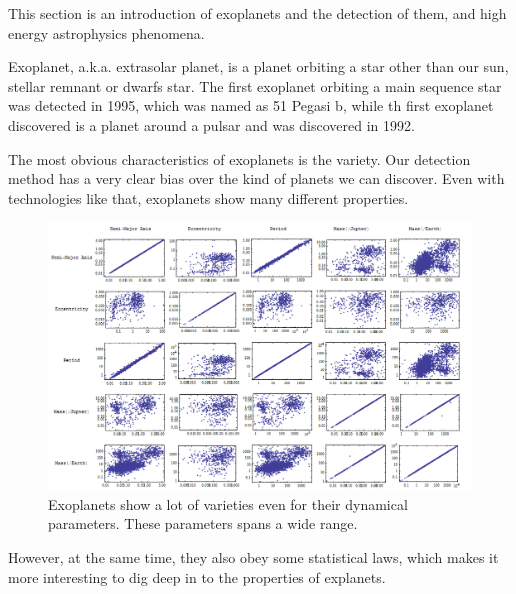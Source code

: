 \documentclass[12pt]{article}
\begin{document}
This section is an introduction of exoplanets and the detection of them, and high energy astrophysics phenomena.

Exoplanet, a.k.a. extrasolar planet, is a planet orbiting a star other than our sun, stellar remnant or dwarfs star. The first exoplanet orbiting a main sequence star was detected in 1995, which was named as 51 Pegasi b, while th first exoplanet discovered is a planet around a pulsar and was discovered in 1992.

The most obvious characteristics of exoplanets is the variety. Our detection method has a very clear bias over the kind of planets we can discover. Even with technologies like that, exoplanets show many different properties.

\begin{figure}
\centering
\includegraphics[width=\textwidth]{./assets/variety-exoplanet}
\caption{Exoplanets show a lot of varieties even for their dynamical parameters. These parameters spans a wide range.}
\label{fig:variety-exo}
\end{figure}

However, at the same time, they also obey some statistical laws, which makes it more interesting to dig deep in to the properties of explanets.
\end{document}
